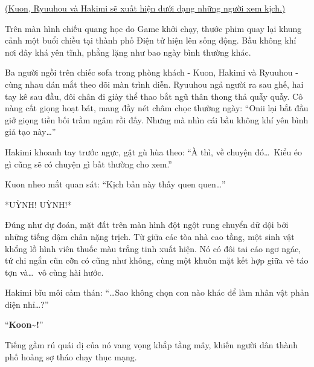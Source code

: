 \documentclass[../main.tex]{subfiles}
\begin{document}

\begin{center}
  \uline{(Kuon, Ryuuhou và Hakimi sẽ xuất hiện dưới dạng những người xem kịch.)}
\end{center}

Trên màn hình chiếu quang học do Game khởi chạy, thước phim quay lại khung cảnh một buổi chiều tại thành phố Điện tử hiện lên sống động. Bầu không khí nơi đây khá yên tĩnh, phẳng lặng như bao ngày bình thường khác.

Ba người ngồi trên chiếc sofa trong phòng khách - Kuon, Hakimi và Ryuuhou - cùng nhau dán mắt theo dõi màn trình diễn. Ryuuhou ngả người ra sau ghế, hai tay kê sau đầu, đôi chân đi giày thể thao bắt ngũ thân thong thả quẫy quẫy. Cô nàng cất giọng hoạt bát, mang đầy nét châm chọc thường ngày: ``Onii lại bắt đầu giở giọng tiền bối trầm ngâm rồi đấy. Nhưng mà nhìn cái bầu không khí yên bình giả tạo này\dots''

Hakimi khoanh tay trước ngực, gật gù hùa theo: ``À thì, về chuyện đó\dots\ Kiểu éo gì cũng sẽ có chuyện gì bất thường cho xem.''

Kuon nheo mắt quan sát: ``Kịch bản này thấy quen quen\dots''

*UỲNH! UỲNH!*

Đúng như dự đoán, mặt đất trên màn hình đột ngột rung chuyển dữ dội bởi những tiếng dậm chân nặng trịch. Từ giữa các tòa nhà cao tầng, một sinh vật khổng lồ hình viên thuốc màu trắng tinh xuất hiện. Nó có đôi tai cáo ngơ ngác, tứ chi ngắn cũn cỡn có cũng như không, cùng một khuôn mặt kết hợp giữa vẻ táo tợn và\dots\ vô cùng hài hước.


Hakimi bĩu môi cảm thán: ``\dots Sao không chọn con nào khác để làm nhân vật phản diện nhỉ\dots?''

``{\Large\textbf{Koon\~{}!}}''

Tiếng gầm rú quái dị của nó vang vọng khắp tầng mây, khiến người dân thành phố hoảng sợ tháo chạy thục mạng.
\end{document}
